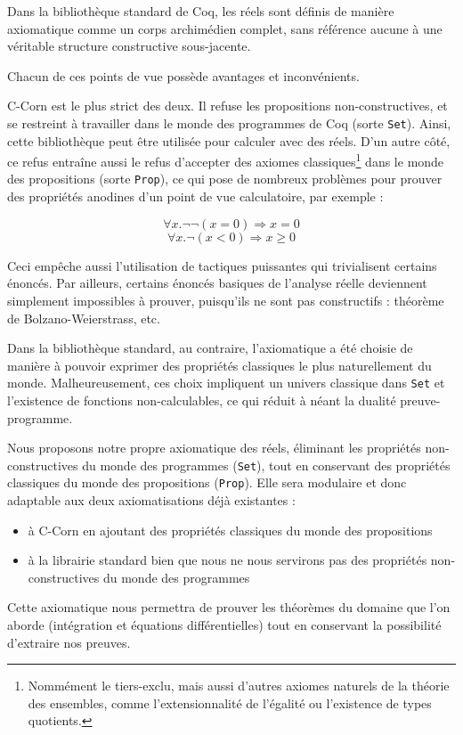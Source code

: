 \documentclass[11pt]{article}
\begin{document}
Dans la bibliothèque standard de Coq, les réels sont définis de manière axiomatique comme un corps archimédien complet, sans référence aucune à une véritable structure constructive sous-jacente.

Chacun de ces points de vue possède avantages et inconvénients.

C-Corn est le plus strict des deux. Il refuse les propositions non-constructives, et se restreint à travailler dans le monde des programmes de Coq (sorte \texttt{Set}). Ainsi, cette bibliothèque peut être utilisée pour calculer avec des réels. D'un autre côté, ce refus entraîne aussi le refus d'accepter des axiomes classiques\footnote{Nommément le tiers-exclu, mais aussi d'autres axiomes naturels de la théorie des ensembles, comme l'extensionnalité de l'égalité ou l'existence de types quotients.} dans le monde des propositions (sorte \texttt{Prop}), ce qui pose de nombreux problèmes pour prouver des propriétés anodines d'un point de vue calculatoire, par exemple :

$$\forall x.\neg\neg(x = 0) \Rightarrow x = 0$$
$$\forall x.\neg(x < 0) \Rightarrow x \geq 0$$

Ceci empêche aussi l'utilisation de tactiques puissantes qui trivialisent certains énoncés. Par ailleurs, certains énoncés basiques de l'analyse réelle deviennent simplement impossibles à prouver, puisqu'ils ne sont pas constructifs : théorème de Bolzano-Weierstrass, etc.

Dans la bibliothèque standard, au contraire, l'axiomatique a été choisie de manière à pouvoir exprimer des propriétés classiques le plus naturellement du monde. Malheureusement, ces choix impliquent un univers classique dans \texttt{Set} et l'existence de fonctions non-calculables, ce qui réduit à néant la dualité preuve-programme.

\bigskip
Nous proposons notre propre axiomatique des réels, éliminant les propriétés non-constructives du monde des programmes (\texttt{Set}), tout en conservant des propriétés classiques du monde des propositions (\texttt{Prop}). 
Elle sera modulaire et donc adaptable aux deux axiomatisations déjà existantes : 
\begin{itemize}
	\item à C-Corn en ajoutant des propriétés classiques du monde des propositions
	\item à la librairie standard bien que nous ne nous servirons pas des propriétés non-constructives du monde des programmes
\end{itemize}
Cette axiomatique nous permettra de prouver les théorèmes du domaine que l'on aborde (intégration et équations différentielles) tout en conservant la possibilité d'extraire nos preuves.
\end{document}
